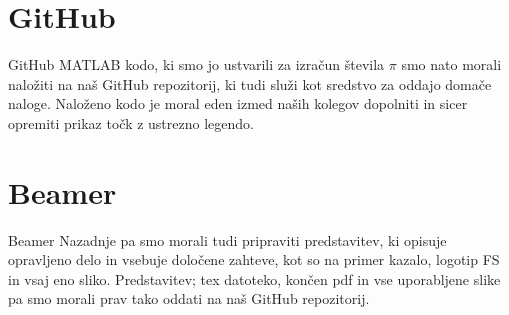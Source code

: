 \documentclass{beamer}
\begin{document}
\section{GitHub}
\begin{frame}{GitHub}
    MATLAB kodo, ki smo jo ustvarili za izračun števila $\pi$ smo nato morali naložiti na naš GitHub repozitorij, ki tudi služi kot sredstvo
    za oddajo domače naloge.
    Naloženo kodo je moral eden izmed naših kolegov dopolniti in sicer opremiti prikaz točk z ustrezno legendo.
\end{frame}


\section{Beamer}
\begin{frame}{Beamer}
    Nazadnje pa smo morali tudi pripraviti predstavitev, ki opisuje opravljeno delo in vsebuje določene zahteve, kot so na primer kazalo, logotip FS in vsaj eno sliko. Predstavitev; tex datoteko, končen pdf in vse uporabljene slike pa smo morali prav tako oddati na naš GitHub repozitorij.
\end{frame}
\end{document}
